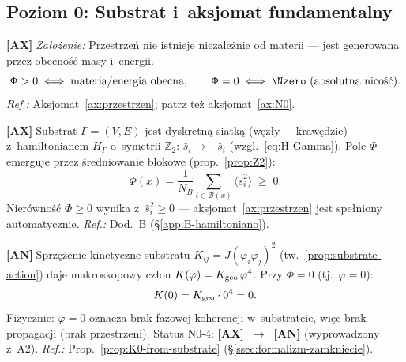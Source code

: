 \subsection{Poziom 0: Substrat i~aksjomat fundamentalny}%
\label{app:H-A1}

\begin{chain}\label{chain:A1}
  \textbf{[AX]}$\;$\emph{Za\l{}o\.zenie:} Przestrze\'n nie istnieje
  niezale\.znie od materii --- jest generowana przez obecno\'s\'c masy
  i~energii.
  \begin{equation}\label{eq:H-A1}
    \Phi > 0 \;\Longleftrightarrow\; \text{materia/energia obecna},
    \qquad
    \Phi = 0 \;\Longleftrightarrow\; \Nzero\text{ (absolutna nico\'s\'c)}.
  \end{equation}
  \emph{Ref.:} Aksjomat~\ref{ax:przestrzen}; patrz te\.z aksjomat~\ref{ax:N0}.
\end{chain}

\begin{chain}\label{chain:A2}
  \textbf{[AX]}$\;$Substrat $\Gamma = (V, E)$ jest dyskretn\k{a}
  siatk\k{a} (w\k{e}z\l{}y + kraw\k{e}dzie) z~hamiltonianem
  $H_\Gamma$ o~symetrii $\mathbb{Z}_2$: $\hat{s}_i \to -\hat{s}_i$
  (wzgl.~\eqref{eq:H-Gamma}).
  Pole $\Phi$ emerguje przez \'sredniowanie blokowe
  (prop.~\ref{prop:Z2}):
  \begin{equation}\label{eq:H-A2}
    \Phi(x) = \frac{1}{N_B}\sum_{i \in \mathcal{B}(x)}\langle \hat{s}_i^2\rangle
    \;\geq\; 0.
  \end{equation}
  Nier\'owno\'s\'c $\Phi \geq 0$ wynika z~$\hat{s}_i^2 \geq 0$ ---
  aksjomat~\ref{ax:przestrzen} jest spe\l{}niony automatycznie.
  \emph{Ref.:} Dod.~B (\S\ref{app:B-hamiltoniano}).
\end{chain}

\begin{chain}[A2b --- Warunek $K(0) = 0$ z~substratu (N0-4)]%
\label{chain:A2b}
  \textbf{[AN]}$\;$Sprz\k{e}\.zenie kinetyczne substratu
  $K_{ij} = J(\varphi_i\varphi_j)^2$ (tw.~\ref{prop:substrate-action})
  daje makroskopowy cz\l{}on $K(\varphi) = K_{\rm geo}\,\varphi^4$.
  Przy $\Phi = 0$ (tj.~$\varphi = 0$):
  \begin{equation}\label{eq:H-K0}
    K(0) = K_{\rm geo} \cdot 0^4 = 0.
  \end{equation}
  Fizycznie: $\varphi = 0$ oznacza brak fazowej koherencji w~substrat\-cie,
  wi\k{e}c brak propagacji (brak przestrzeni).
  Status N0-4: \textbf{[AX]~$\to$~[AN]} (wyprowadzony z~A2).
  \emph{Ref.:} Prop.~\ref{prop:K0-from-substrate} (\S\ref{ssec:formalizm-zamkniecie}).
\end{chain}

